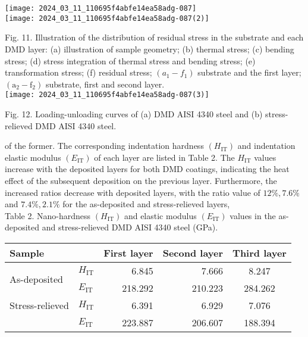 \documentclass[10pt]{article}
\begin{document}
\texttt{[image: 2024\_03\_11\_110695f4abfe14ea58adg-087]}\\
\texttt{[image: 2024\_03\_11\_110695f4abfe14ea58adg-087(2)]}

Fig. 11. Illustration of the distribution of residual stress in the substrate and each DMD layer: (a) illustration of sample geometry; (b) thermal stress; (c) bending stress; (d) stress integration of thermal stress and bending stress; (e) transformation stress; (f) residual stress; $\left(a_{1}-f_{1}\right)$ substrate and the first layer; $\left(\mathrm{a}_{2}-\mathrm{f}_{2}\right)$ substrate, first and second layer.\\
\texttt{[image: 2024\_03\_11\_110695f4abfe14ea58adg-087(3)]}

Fig. 12. Loading-unloading curves of (a) DMD AISI 4340 steel and (b) stress-relieved DMD AISI 4340 steel.

of the former. The corresponding indentation hardness $\left(H_{\mathrm{IT}}\right)$ and indentation elastic modulus $\left(E_{\mathrm{IT}}\right)$ of each layer are listed in Table 2. The $H_{\mathrm{IT}}$ values increase with the deposited layers for both DMD coatings, indicating the heat effect of the subsequent deposition on the previous layer. Furthermore, the increased ratios decrease with deposited layers, with the ratio value of $12 \%, 7.6 \%$ and $7.4 \%, 2.1 \%$ for the as-deposited and stress-relieved layers,\\
Table 2. Nano-hardness $\left(H_{\mathrm{IT}}\right)$ and elastic modulus $\left(E_{\mathrm{IT}}\right)$ values in the as-deposited and stress-relieved DMD AISI 4340 steel (GPa).

\begin{center}
\begin{tabular}{llrrc}
\hline
Sample &  & First layer & Second layer & Third layer \\
\hline
\multirow{2}{*}{As-deposited} & $H_{\mathrm{IT}}$ & 6.845 & 7.666 & 8.247 \\
 & $E_{\mathrm{IT}}$ & 218.292 & 210.223 & 284.262 \\
Stress-relieved & $H_{\mathrm{IT}}$ & 6.391 & 6.929 & 7.076 \\
 & $E_{\mathrm{IT}}$ & 223.887 & 206.607 & 188.394 \\
\hline
\end{tabular}
\end{center}
\end{document}
